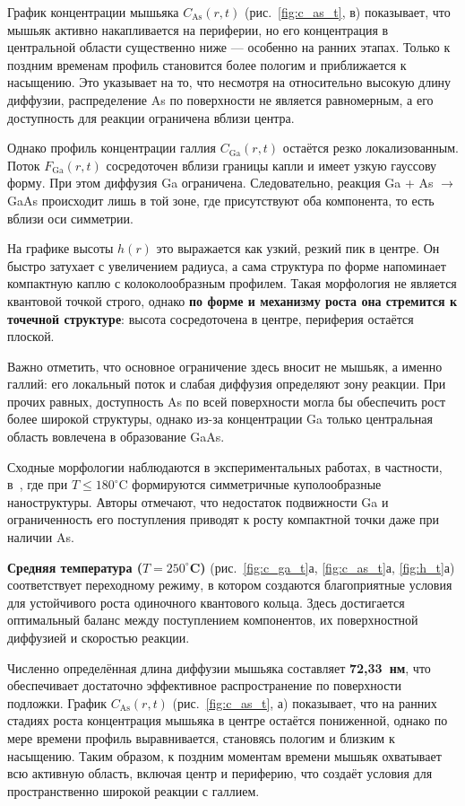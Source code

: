 \documentclass[14pt,oneside]{extarticle}
\begin{document}
График концентрации мышьяка $C_{\text{As}}(r, t)$ (рис.~\ref{fig:c_as_t}, в) показывает, что мышьяк активно накапливается на периферии, но его концентрация в центральной области существенно ниже — особенно на ранних этапах. Только к поздним временам профиль становится более пологим и приближается к насыщению. Это указывает на то, что несмотря на относительно высокую длину диффузии, распределение As по поверхности не является равномерным, а его доступность для реакции ограничена вблизи центра.

Однако профиль концентрации галлия $C_{\text{Ga}}(r, t)$ остаётся резко локализованным. Поток $F_{\text{Ga}}(r, t)$ сосредоточен вблизи границы капли и имеет узкую гауссову форму. При этом диффузия Ga ограничена. Следовательно, реакция Ga + As $\rightarrow$ GaAs происходит лишь в той зоне, где присутствуют оба компонента, то есть вблизи оси симметрии.

На графике высоты $h(r)$ это выражается как узкий, резкий пик в центре. Он быстро затухает с увеличением радиуса, а сама структура по форме напоминает компактную каплю с колоколообразным профилем. Такая морфология не является квантовой точкой строго, однако \textbf{по форме и механизму роста она стремится к точечной структуре}: высота сосредоточена в центре, периферия остаётся плоской.

Важно отметить, что основное ограничение здесь вносит не мышьяк, а именно галлий: его локальный поток и слабая диффузия определяют зону реакции. При прочих равных, доступность As по всей поверхности могла бы обеспечить рост более широкой структуры, однако из-за концентрации Ga только центральная область вовлечена в образование GaAs.

Сходные морфологии наблюдаются в экспериментальных работах, в частности, в~\cite{gurioli2021droplet}, где при $T \leq 180^\circ$C формируются симметричные куполообразные наноструктуры. Авторы отмечают, что недостаток подвижности Ga и ограниченность его поступления приводят к росту компактной точки даже при наличии As.

\textbf{Средняя температура ($T = 250^\circ$C)} (рис.~\ref{fig:c_ga_t}а, \ref{fig:c_as_t}а, \ref{fig:h_t}а) соответствует переходному режиму, в котором создаются благоприятные условия для устойчивого роста одиночного квантового кольца. Здесь достигается оптимальный баланс между поступлением компонентов, их поверхностной диффузией и скоростью реакции.

Численно определённая длина диффузии мышьяка составляет \textbf{72{,}33~нм}, что обеспечивает достаточно эффективное распространение по поверхности подложки. График $C_{\text{As}}(r, t)$ (рис.~\ref{fig:c_as_t}, а) показывает, что на ранних стадиях роста концентрация мышьяка в центре остаётся пониженной, однако по мере времени профиль выравнивается, становясь пологим и близким к насыщению. Таким образом, к поздним моментам времени мышьяк охватывает всю активную область, включая центр и периферию, что создаёт условия для пространственно широкой реакции с галлием.
\end{document}
